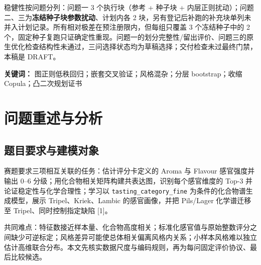 \documentclass[11pt,a4paper]{article}
\begin{document}
稳健性按问题分列：问题一 3 个执行块（参考 + 种子块 +
内层正则扰动）；问题二、三为\textbf{冻结种子块参数扰动}、计划内各 2
块，另有登记后补跑的补充块单列未并入计划记录。所有相对极差在预注册限内，但每组只覆盖
3 个冻结种子中的 2
个，固定种子复跑只证确定性重现。问题一的划分完整性/留出评价、问题三的原生优化检查结构性未通过，三问选择状态均为草稿选择；交付检查未过最终门禁，本稿是
DRAFT。

\textbf{关键词：} 图正则低秩回归；嵌套交叉验证；风格混杂；分层
bootstrap；收缩 Copula；凸二次规划证书

\newpage
\thispagestyle{empty}
\tableofcontents
\newpage
{}

\section{问题重述与分析}\label{ux95eeux9898ux91cdux8ff0ux4e0eux5206ux6790}

\subsection{题目要求与建模对象}\label{ux9898ux76eeux8981ux6c42ux4e0eux5efaux6a21ux5bf9ux8c61}

赛题要求三项相互关联的任务：估计评分卡定义的 Aroma 与 Flavour
感官强度并输出 0--6
分级；用化合物相关矩阵构建共表达图，识别每个感官维度的 Top-3
并论证稳定性与化学合理性；学习以 \texttt{tasting\_category\_fine}
为条件的化合物谱生成模型，展示 Tripel、Kriek、Lambic 的感官画像，并把
Pils/Lager 化学谱迁移至 Tripel、同时控制指定缺陷 {[}1{]}。

共同难点：特征数接近样本量、化合物高度相关；标准化感官值与原始整数评分之间缺少可逆标定；风格差异可能使总体相关偏离风格内关系；小样本风格难以独立估计高维联合分布。本文先核实数据尺度与编码规则，再为每问固定评价协议、最后比较候选。
\end{document}
